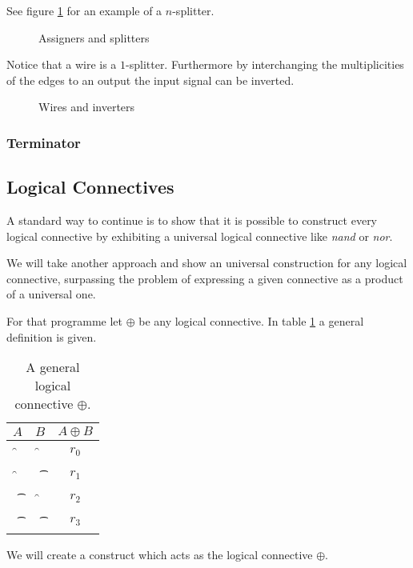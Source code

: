See figure \ref{figure:constructsA} for an example of a $n$-splitter.
\begin{figure}
	\begin{center}
	\end{center}
	\caption{Assigners and splitters}\label{figure:constructsA}
\end{figure}

Notice that a wire is a $1$-splitter. Furthermore by interchanging the
multiplicities of the edges to an output the input signal can be
inverted.
\begin{figure}
	\begin{center}
	\end{center}
	\caption{Wires and inverters}\label{figure:constructsB}
\end{figure}

\subsubsection{Terminator}

\subsection{Logical Connectives}

A standard way to continue is to show that it is possible to construct
every logical connective by exhibiting a universal logical connective
like \emph{nand} or \emph{nor}.

We will take another approach and show an universal construction for any
logical connective, surpassing the problem of expressing a given
connective as a product of a universal one.

For that programme let $\oplus$ be any logical connective. In table
\ref{table:oplus} a general definition is given.
\begin{table}
	\begin{center}
		\begin{tabular}{c|c|c}
			$A$ & $B$ & $A \oplus B$ \\
			\hline
			\f & \f & $r_0$ \\
			\f & \t & $r_1$ \\
			\t & \f & $r_2$ \\
			\t & \t & $r_3$ \\
		\end{tabular}
	\end{center}
	\caption{A general logical connective $\oplus$.}\label{table:oplus} 
\end{table}
We will create a construct which acts as the logical connective
$\oplus$.

